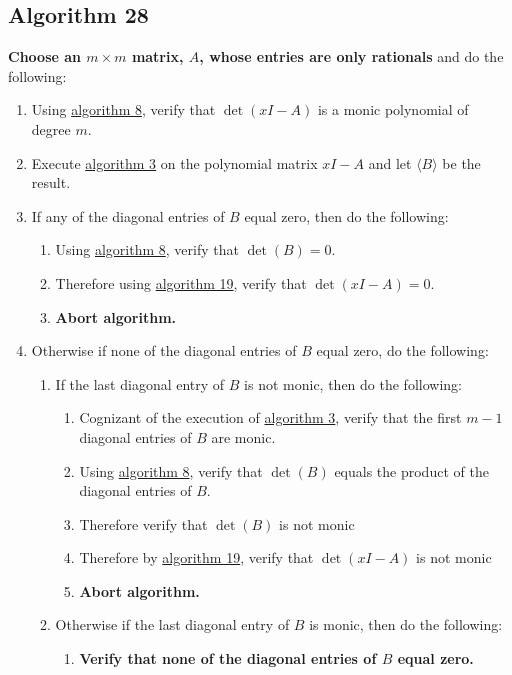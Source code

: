 \documentclass[twocolumn]{article}
\begin{document}
		\subsection{Algorithm 28}\label{sec:algorithm 28}
			\textbf{Choose an $m\times m$ matrix, $A$, whose entries are only rationals} and do the following:
			\begin{enumerate}
				\item Using \hyperref[sec:algorithm 8]{algorithm 8}, verify that $\det(xI-A)$ is a monic polynomial of degree $m$.
				\item Execute \hyperref[sec:algorithm 3]{algorithm 3} on the polynomial matrix $xI-A$ and let $\langle B\rangle$ be the result.
				\item If any of the diagonal entries of $B$ equal zero, then do the following:
				\begin{enumerate}
					\item Using \hyperref[sec:algorithm 8]{algorithm 8}, verify that $\det(B)=0$.
					\item Therefore using \hyperref[sec:algorithm 19]{algorithm 19}, verify that $\det(xI-A)=0$.
					\item \textbf{Abort algorithm.}
				\end{enumerate}
				\item Otherwise if none of the diagonal entries of $B$ equal zero, do the following:
				\begin{enumerate}
					\item If the last diagonal entry of $B$ is not monic, then do the following:
					\begin{enumerate}
						\item Cognizant of the execution of \hyperref[sec:algorithm 3]{algorithm 3}, verify that the first $m-1$ diagonal entries of $B$ are monic.
						\item Using \hyperref[sec:algorithm 8]{algorithm 8}, verify that $\det(B)$ equals the product of the diagonal entries of $B$.
						\item Therefore verify that $\det(B)$ is not monic
						\item Therefore by \hyperref[sec:algorithm 19]{algorithm 19}, verify that $\det(xI-A)$ is not monic
						\item \textbf{Abort algorithm.}
					\end{enumerate}
					\item Otherwise if the last diagonal entry of $B$ is monic, then do the following:
					\begin{enumerate}
						\item \textbf{Verify that none of the diagonal entries of $B$ equal zero.}

\end{enumerate}
\end{enumerate}
\end{enumerate}
\end{document}
